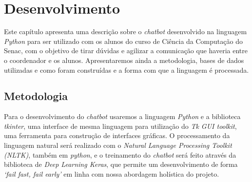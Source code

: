 \documentclass[
	12pt,				%
	oneside,
	a4paper,			%
	english,			%
	french,				%
	spanish,			%
	brazil				%
	]{abntex2}
\begin{document}

\section{Desenvolvimento}

Este capítulo apresenta uma descrição sobre o \emph{chatbot} desenvolvido na linguagem \emph{Python} para ser utilizado com os alunos do curso de Ciência da Computação do Senac, com o objetivo de tirar dúvidas e agilizar a comunicação que haveria entre o coordenador e os alunos.
Apresentaremos ainda a metodologia, bases de dados utilizadas e como foram construídas e a forma com que a linguagem é processada.


\subsection{Metodologia}

Para o desenvolvimento do \emph{chatbot} usaremos a linguagem \emph{Python} e a biblioteca \emph{tkinter}, uma interface de mesma linguagem para utilização do \emph{Tk GUI toolkit}, uma ferramenta para construção de interfaces gráficas. O processamento da linguagem natural será realizado com o \emph{Natural Language Processing Toolkit (NLTK)}, também em \emph{python}, e o treinamento do \emph{chatbot} será feito através da biblioteca de \emph{Deep Learning Keras}, que permite um desenvolvimento de forma \emph{‘fail fast, fail early’} em linha com nossa abordagem holística do projeto.
\end{document}

